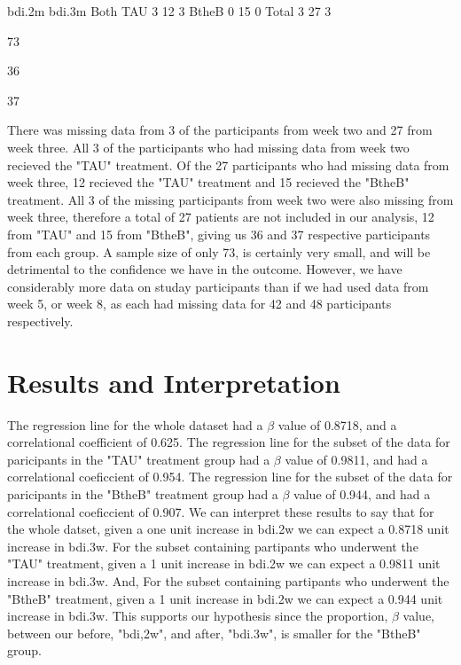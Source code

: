\documentclass{article}
\begin{document}
\begin{Schunk}
\begin{Soutput}
      bdi.2m bdi.3m Both
TAU        3     12    3
BtheB      0     15    0
Total      3     27    3
\end{Soutput}
\begin{Soutput}
[1] 73
\end{Soutput}
\begin{Soutput}
[1] 36
\end{Soutput}
\begin{Soutput}
[1] 37
\end{Soutput}
\end{Schunk}
There was missing data from 3 of the participants from week two and 27 from week three.  All 3 of the participants who had missing data from week two recieved the "TAU" treatment.  Of the 27 participants who had missing data from week three, 12 recieved the "TAU" treatment and 15 recieved the "BtheB" treatment.  All 3 of the missing participants from week two were also missing from week three, therefore a total of 27 patients are not included in our analysis, 12 from "TAU" and 15 from "BtheB", giving us 36 and 37 respective participants from each group.  A sample size of only 73, is certainly very small, and will be detrimental to the confidence we have in the outcome.  However, we have considerably more data on studay participants than if we had used data from week 5, or week 8, as each had missing data for 42 and 48 participants respectively.

\section{Results and Interpretation}

The regression line for the whole dataset had a $\beta$ value of 0.8718, and a correlational coefficient of 0.625.  The regression line for the subset of the data for paricipants in the "TAU" treatment group had a $\beta$  value of 0.9811, and had a correlational coeficcient of 0.954. The regression line for the subset of the data for paricipants in the "BtheB" treatment group had a $\beta$  value of 0.944, and had a correlational coeficcient of 0.907.
We can interpret these results to say that for the whole datset, given a one unit increase in bdi.2w we can expect a 0.8718 unit increase in bdi.3w.  For the subset containing partipants who underwent the "TAU" treatment, given a 1 unit increase in bdi.2w we can expect a 0.9811 unit increase in bdi.3w. And, For the subset containing partipants who underwent the "BtheB" treatment, given a 1 unit increase in bdi.2w we can expect a 0.944 unit increase in bdi.3w.  This supports our hypothesis since the proportion, $\beta$ value, between our before, "bdi,2w", and after, "bdi.3w", is smaller for the "BtheB" group.
\end{document}
